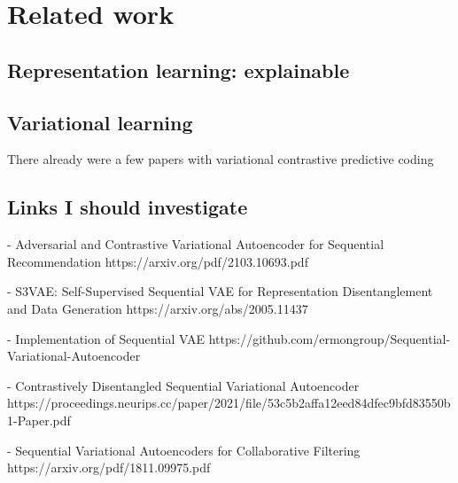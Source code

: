 
\chapter{Related work}
\section{Representation learning: explainable}
\section{Variational learning}
There already were a few papers with variational contrastive predictive coding

\section{Links I should investigate}

- Adversarial and Contrastive Variational Autoencoder for Sequential Recommendation
https://arxiv.org/pdf/2103.10693.pdf

- S3VAE: Self-Supervised Sequential VAE for Representation Disentanglement and Data Generation
https://arxiv.org/abs/2005.11437

- Implementation of Sequential VAE
https://github.com/ermongroup/Sequential-Variational-Autoencoder

- Contrastively Disentangled Sequential Variational Autoencoder
https://proceedings.neurips.cc/paper/2021/file/53c5b2affa12eed84dfec9bfd83550b1-Paper.pdf

- Sequential Variational Autoencoders for Collaborative Filtering
https://arxiv.org/pdf/1811.09975.pdf

